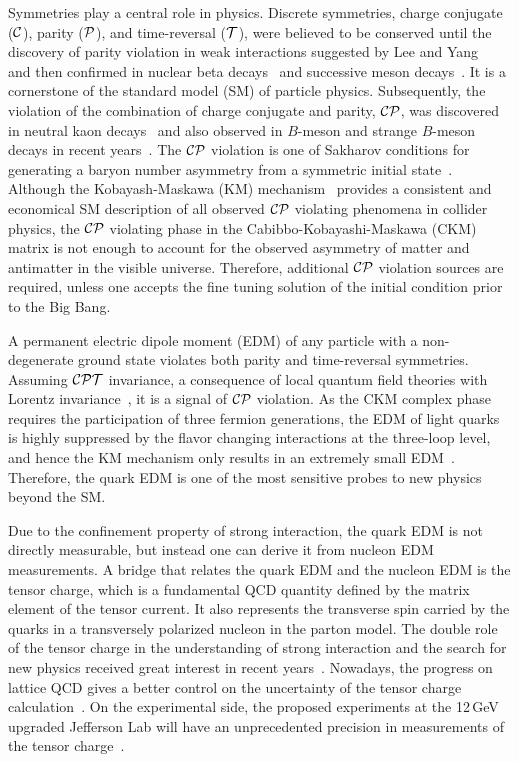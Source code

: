 \documentclass[aps,prd,twocolumn,groupedaddress,showpacs,superscriptaddress,floatfix,nofootinbib,10pt]{revtex4-1}
\begin{document}
Symmetries play a central role in physics. Discrete symmetries, charge conjugate ($\cal C$), parity ($\cal P$), and time-reversal ($\cal T$), were believed to be conserved until the discovery of parity violation in weak interactions suggested by Lee and Yang~\cite{Lee:1956qn} and then confirmed in nuclear beta decays~\cite{Wu:1957my} and successive meson decays~\cite{Garwin:1957hc}. It is a cornerstone of the standard model (SM) of particle physics. Subsequently, the violation of the combination of charge conjugate and parity, $\cal CP$, was discovered in neutral kaon decays~\cite{Christenson:1964fg} and also observed in $B$-meson and strange $B$-meson decays in recent years~\cite{Aubert:2001nu,Abe:2001xe,Aaij:2013iua}. The $\cal CP$ violation is one of Sakharov conditions for generating a baryon number asymmetry from a symmetric initial state~\cite{Sakharov:1967rr}. Although the Kobayash-Maskawa (KM) mechanism~\cite{Kobayashi:1973fv} provides a consistent and economical SM description of all observed $\cal CP$ violating phenomena in collider physics, the $\cal CP$ violating phase in the Cabibbo-Kobayashi-Maskawa (CKM) matrix is not enough to account for the observed asymmetry of matter and antimatter in the visible universe. Therefore, additional $\cal CP$ violation sources are required, unless one accepts the fine tuning solution of the initial condition prior to the Big Bang.

A permanent electric dipole moment (EDM) of any particle with a non-degenerate ground state violates both parity and time-reversal symmetries. Assuming $\cal CPT$ invariance, a consequence of local quantum field theories with Lorentz invariance~\cite{Luders:1954zz,Lueders:1992dq,Bell:1996nh,Pauli:1955}, it is a signal of $\cal CP$ violation.
As the CKM complex phase requires the participation of three fermion generations, the EDM of light quarks is highly suppressed by the flavor changing interactions at the three-loop level, and hence the KM mechanism only results in an extremely small EDM~\cite{Czarnecki:1997bu,Gavela:1981sk,Khriplovich:1981ca}. Therefore, the quark EDM is one of the most sensitive probes to new physics beyond the SM. 

Due to the confinement property of strong interaction, the quark EDM is not directly measurable, but instead one can derive it from nucleon EDM measurements. A bridge that relates the quark EDM and the nucleon EDM is the tensor charge, which is a fundamental QCD quantity defined by the matrix element of the tensor current. It also represents the transverse spin carried by the quarks in a transversely polarized nucleon in the parton model. The double role of the tensor charge in the understanding of strong interaction and the search for new physics received great interest in recent years~\cite{Courtoy:2015haa}. Nowadays, the progress on lattice QCD gives a better control on the uncertainty of the tensor charge calculation~\cite{Bhattacharya:2015esa}. On the experimental side, the proposed experiments at the 12\,GeV upgraded Jefferson Lab will have an unprecedented precision in measurements of the tensor charge~\cite{Gao:2010av}.
\end{document}
